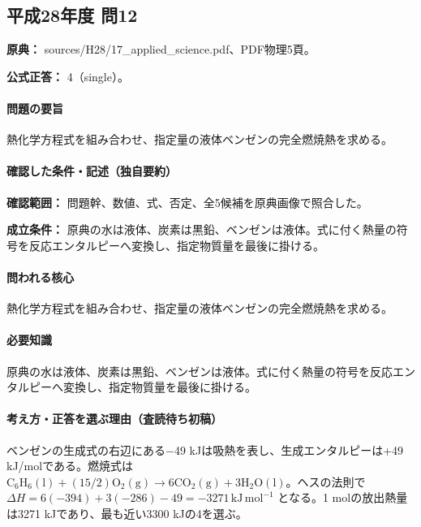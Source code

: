 \subsection{平成28年度 問12}
\label{q:h28-reg-applied-12}

\noindent\textbf{原典：} sources/H28/17\_applied\_science.pdf、PDF物理5頁。

\textbf{公式正答：} 4（single）。

\paragraph{問題の要旨} 熱化学方程式を組み合わせ、指定量の液体ベンゼンの完全燃焼熱を求める。

\paragraph{確認した条件・記述（独自要約）}\mbox{}\par

\noindent\textbf{確認範囲：} 問題幹、数値、式、否定、全5候補を原典画像で照合した。\par

\noindent\textbf{成立条件：} 原典の水は液体、炭素は黒鉛、ベンゼンは液体。式に付く熱量の符号を反応エンタルピーへ変換し、指定物質量を最後に掛ける。\par

\paragraph{問われる核心} 熱化学方程式を組み合わせ、指定量の液体ベンゼンの完全燃焼熱を求める。

\paragraph{必要知識} 原典の水は液体、炭素は黒鉛、ベンゼンは液体。式に付く熱量の符号を反応エンタルピーへ変換し、指定物質量を最後に掛ける。

\paragraph{考え方・正答を選ぶ理由（査読待ち初稿）} ベンゼンの生成式の右辺にある−49 kJは吸熱を表し、生成エンタルピーは+49 kJ/molである。燃焼式は \(\mathrm{C_6H_6(l)}+(15/2)\mathrm{O_2(g)}\to6\mathrm{CO_2(g)}+3\mathrm{H_2O(l)}\)。ヘスの法則で \(\Delta H=6(-394)+3(-286)-49=-3271\,\mathrm{kJ\,mol^{-1}}\) となる。1 molの放出熱量は3271 kJであり、最も近い3300 kJの4を選ぶ。

